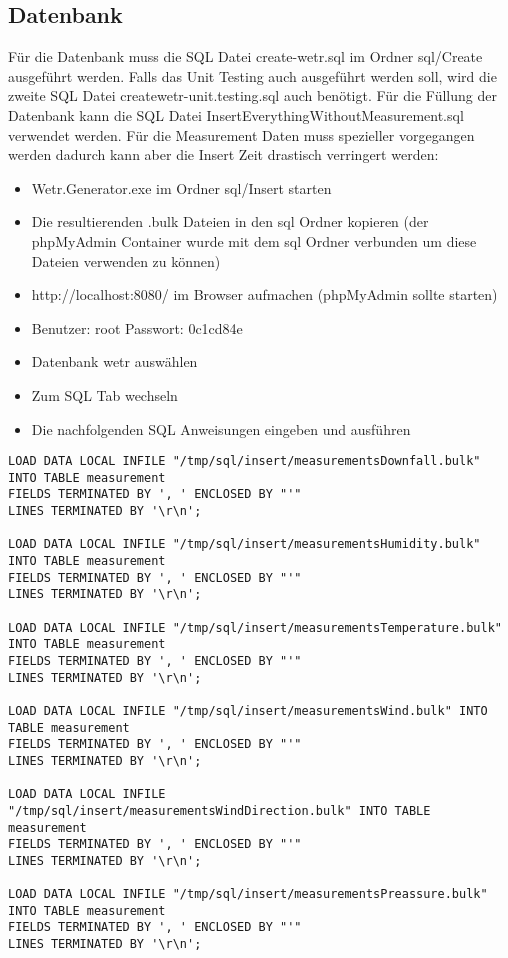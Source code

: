 \subsection{Datenbank}
Für die Datenbank muss die SQL Datei \grqq{}create-wetr.sql \grqq{} im Ordner sql/Create ausgeführt werden. Falls das Unit Testing auch ausgeführt werden soll, wird die zweite SQL Datei \grqq{}create\textunderscore wetr-unit.testing.sql \grqq{} auch benötigt.
\newline\newline
Für die Füllung der Datenbank kann die SQL Datei \grqq{}InsertEverythingWithoutMeasurement.sql\grqq{} verwendet werden. Für die Measurement Daten muss spezieller vorgegangen werden dadurch kann aber die Insert Zeit drastisch verringert werden:
\begin{itemize}
\item Wetr.Generator.exe im Ordner sql/Insert starten
\item Die resultierenden \grqq{}.bulk\grqq{} Dateien in den sql Ordner kopieren (der phpMyAdmin Container wurde mit dem sql Ordner verbunden um diese Dateien verwenden zu können)
\item http://localhost:8080/ im Browser aufmachen \newline (phpMyAdmin sollte starten)
\item Benutzer: root Passwort: 0c1cd84e
\item Datenbank wetr auswählen
\item Zum SQL Tab wechseln
\item Die nachfolgenden SQL Anweisungen eingeben und ausführen
\end{itemize}
\newpage
\begin{verbatim}
LOAD DATA LOCAL INFILE "/tmp/sql/insert/measurementsDownfall.bulk" INTO TABLE measurement
FIELDS TERMINATED BY ', ' ENCLOSED BY "'"
LINES TERMINATED BY '\r\n';

LOAD DATA LOCAL INFILE "/tmp/sql/insert/measurementsHumidity.bulk" INTO TABLE measurement
FIELDS TERMINATED BY ', ' ENCLOSED BY "'"
LINES TERMINATED BY '\r\n';

LOAD DATA LOCAL INFILE "/tmp/sql/insert/measurementsTemperature.bulk" INTO TABLE measurement
FIELDS TERMINATED BY ', ' ENCLOSED BY "'"
LINES TERMINATED BY '\r\n';

LOAD DATA LOCAL INFILE "/tmp/sql/insert/measurementsWind.bulk" INTO TABLE measurement
FIELDS TERMINATED BY ', ' ENCLOSED BY "'"
LINES TERMINATED BY '\r\n';

LOAD DATA LOCAL INFILE "/tmp/sql/insert/measurementsWindDirection.bulk" INTO TABLE measurement
FIELDS TERMINATED BY ', ' ENCLOSED BY "'"
LINES TERMINATED BY '\r\n';

LOAD DATA LOCAL INFILE "/tmp/sql/insert/measurementsPreassure.bulk" INTO TABLE measurement
FIELDS TERMINATED BY ', ' ENCLOSED BY "'"
LINES TERMINATED BY '\r\n';
\end{verbatim}